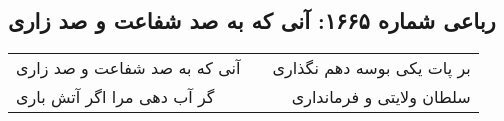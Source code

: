 \begin{center}
\section*{رباعی شماره ۱۶۶۵: آنی که به صد شفاعت و صد زاری}
\label{sec:1665}
\begin{longtable}{l p{0.5cm} r}
آنی که به صد شفاعت و صد زاری
&&
بر پات یکی بوسه دهم نگذاری
\\
گر آب دهی مرا اگر آتش باری
&&
سلطان ولایتی و فرمانداری
\\
\end{longtable}
\end{center}
